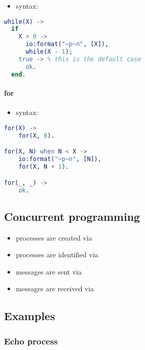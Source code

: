 \documentclass[a4paper,landscape,10pt]{article}
\begin{document}
\begin{multicols*}{2}
  \begin{itemize}
    \item syntax: 
  \end{itemize}

  \begin{lstlisting}[language=Erlang]
while(X) ->
  if
    X > 0 ->
      io:format("~p~n", [X]),
      while(X - 1);
    true -> % this is the default case
      ok.
  end.
  \end{lstlisting}

  \breakcolumn

  \paragraph{for}

  \begin{itemize}
    \item syntax: 
  \end{itemize}

  \begin{lstlisting}[language=Erlang]
for(X) ->
    for(X, 0).

for(X, N) when N < X ->
    io:format("~p~n", [N]),
    for(X, N + 1).

for(_, _) ->
    ok.
  \end{lstlisting}

  \subsection{Concurrent programming}

  \begin{itemize}
    \item processes are created via 
    \item processes are identified via 
    \item messages are sent via 
    \item messages are received via 
  \end{itemize}

  \breakcolumn

  \subsection{Examples}

  \subsubsection{Echo process}


\end{multicols*}
\end{document}
